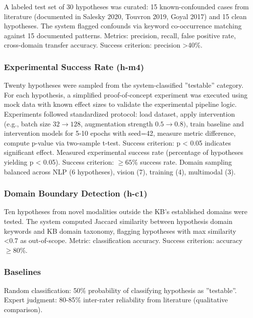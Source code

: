 A labeled test set of 30 hypotheses was curated: 15 known-confounded cases from literature (documented in Salesky 2020, Touvron 2019, Goyal 2017) and 15 clean hypotheses. The system flagged confounds via keyword co-occurrence matching against 15 documented patterns. Metrics: precision, recall, false positive rate, cross-domain transfer accuracy. Success criterion: precision >40\%.

\subsubsection{Experimental Success Rate (h-m4)}

Twenty hypotheses were sampled from the system-classified ''testable'' category. For each hypothesis, a simplified proof-of-concept experiment was executed using mock data with known effect sizes to validate the experimental pipeline logic. Experiments followed standardized protocol: load dataset, apply intervention (e.g., batch size $32\rightarrow 128$, augmentation strength 0.$5\rightarrow 0.8)$, train baseline and intervention models for 5-10 epochs with seed=42, measure metric difference, compute p-value via two-sample t-test. Success criterion: p < 0.05 indicates significant effect. Measured experimental success rate (percentage of hypotheses yielding p < 0.05). Success criterion: $\geq 65$\% success rate. Domain sampling balanced across NLP (6 hypotheses), vision (7), training (4), multimodal (3).

\subsubsection{Domain Boundary Detection (h-c1)}

Ten hypotheses from novel modalities outside the KB's established domains were tested. The system computed Jaccard similarity between hypothesis domain keywords and KB domain taxonomy, flagging hypotheses with max similarity <0.7 as out-of-scope. Metric: classification accuracy. Success criterion: accuracy $\geq 80$\%.

\subsubsection{Baselines}

Random classification: 50\% probability of classifying hypothesis as ''testable''. Expert judgment: 80-85\% inter-rater reliability from literature (qualitative comparison).
